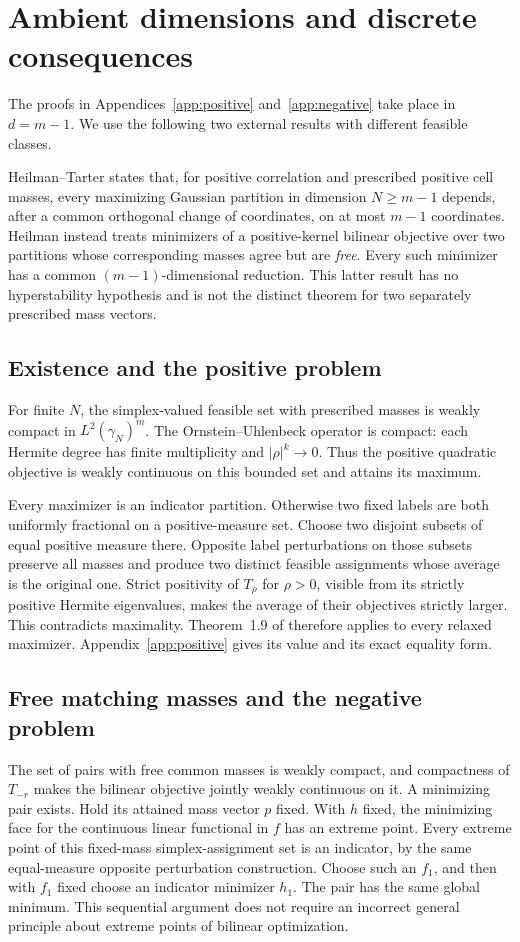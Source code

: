 \section{Ambient dimensions and discrete consequences}\label{sec:dimension}
The proofs in Appendices~\ref{app:positive} and~\ref{app:negative} take place
in $d=m-1$. We use the following two external results with different feasible
classes.

Heilman--Tarter \cite[Theorem 1.9]{HT2021} states that, for positive
correlation and prescribed positive cell masses, every maximizing Gaussian
partition in dimension $N\geq m-1$ depends, after a common orthogonal change
of coordinates, on at most $m-1$ coordinates.
Heilman \cite[Problem 7.1 and Theorem 7.9]{H2022} instead treats minimizers of
a positive-kernel bilinear objective over two partitions whose corresponding
masses agree but are \emph{free}. Every such minimizer has a common
$(m-1)$-dimensional reduction. This latter result has no hyperstability
hypothesis and is not the distinct theorem for two separately prescribed
mass vectors.

\subsection{Existence and the positive problem}
For finite $N$, the simplex-valued feasible set with prescribed masses is
weakly compact in $L^2(\gamma_N)^m$. The Ornstein--Uhlenbeck operator is compact:
each Hermite degree has finite multiplicity and $|\rho|^k\to0$.
Thus the positive quadratic objective is weakly continuous on this bounded
set and attains its maximum.

Every maximizer is an indicator partition. Otherwise two fixed labels are
both uniformly fractional on a positive-measure set. Choose two disjoint
subsets of equal positive measure there. Opposite label perturbations on
those subsets preserve all masses and produce two distinct feasible
assignments whose average is the original one. Strict positivity of $T_\rho$
for $\rho>0$, visible from its strictly positive Hermite eigenvalues, makes
the average of their objectives strictly larger. This contradicts maximality.
Theorem~1.9 of \cite{HT2021} therefore applies to every relaxed maximizer.
Appendix~\ref{app:positive} gives its value and its exact equality form.

\subsection{Free matching masses and the negative problem}
The set of pairs with free common masses is weakly compact, and compactness
of $T_{-r}$ makes the bilinear objective jointly weakly continuous on it.
A minimizing pair exists. Hold its attained mass vector $p$ fixed.
With $h$ fixed, the minimizing face for the continuous linear functional in
$f$ has an extreme point. Every extreme point of this fixed-mass
simplex-assignment set is an indicator, by the same equal-measure opposite
perturbation construction. Choose such an $f_1$, and then with $f_1$ fixed
choose an indicator minimizer $h_1$. The pair has the same global minimum.
This sequential argument does not require an incorrect general principle
about extreme points of bilinear optimization.

